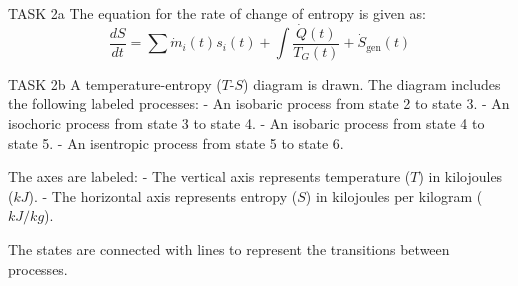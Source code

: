 TASK 2a  
The equation for the rate of change of entropy is given as:  
\[
\frac{dS}{dt} = \sum \dot{m}_i(t) s_i(t) + \int \frac{\dot{Q}(t)}{T_G(t)} + \dot{S}_{\text{gen}}(t)
\]

TASK 2b  
A temperature-entropy (\(T\)-\(S\)) diagram is drawn. The diagram includes the following labeled processes:  
- An isobaric process from state 2 to state 3.  
- An isochoric process from state 3 to state 4.  
- An isobaric process from state 4 to state 5.  
- An isentropic process from state 5 to state 6.  

The axes are labeled:  
- The vertical axis represents temperature (\(T\)) in kilojoules (\(kJ\)).  
- The horizontal axis represents entropy (\(S\)) in kilojoules per kilogram (\(kJ/kg\)).  

The states are connected with lines to represent the transitions between processes.